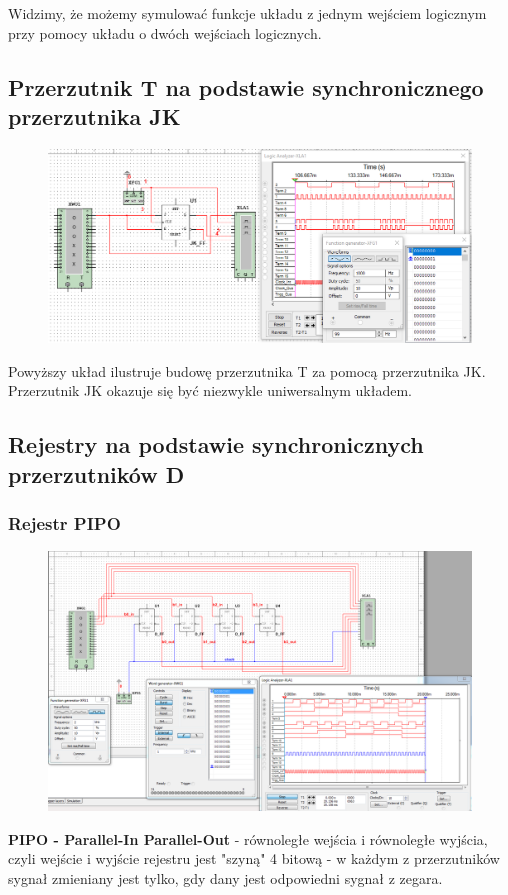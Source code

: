 \documentclass[12pt,a4paper]{article}
\begin{document}
Widzimy, że możemy symulować funkcje układu z jednym wejściem logicznym przy pomocy układu o dwóch wejściach logicznych.

\newpage
\subsection{Przerzutnik T na podstawie synchronicznego przerzutnika JK}
\begin{figure}[H]
\centering
\includegraphics[width=\textwidth]{img/3g}
\end{figure}

Powyższy układ ilustruje budowę przerzutnika T za pomocą przerzutnika JK. Przerzutnik JK okazuje się być  niezwykle uniwersalnym układem.

\newpage
\subsection{Rejestry na podstawie synchronicznych przerzutników D}
\subsubsection{Rejestr PIPO}
\begin{figure}[H]
\centering
\includegraphics[width=\textwidth]{img/3hPIPO}
\end{figure}
\textbf{PIPO - Parallel-In Parallel-Out} - równoległe wejścia i równoległe wyjścia, czyli wejście i wyjście rejestru jest "szyną" 4 bitową - w każdym z przerzutników sygnał zmieniany jest tylko, gdy dany jest odpowiedni sygnał z zegara.
\end{document}
